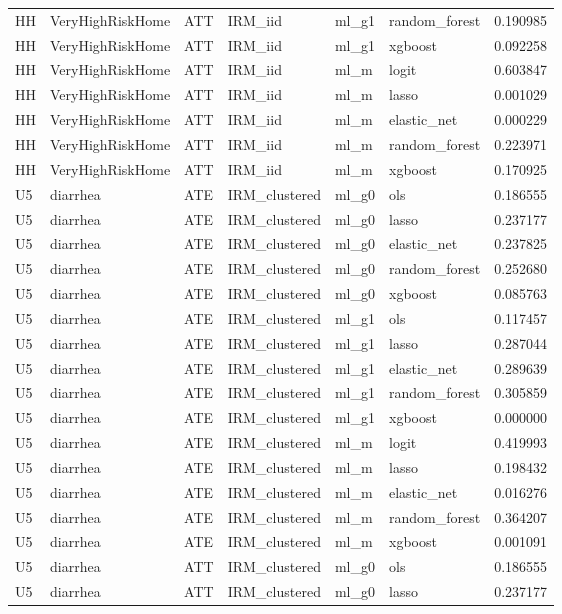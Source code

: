 \begin{longtable}{llllllr}
HH & VeryHighRiskHome & ATT & IRM\_iid & ml\_g1 & random\_forest & 0.190985 \\
HH & VeryHighRiskHome & ATT & IRM\_iid & ml\_g1 & xgboost & 0.092258 \\
HH & VeryHighRiskHome & ATT & IRM\_iid & ml\_m & logit & 0.603847 \\
HH & VeryHighRiskHome & ATT & IRM\_iid & ml\_m & lasso & 0.001029 \\
HH & VeryHighRiskHome & ATT & IRM\_iid & ml\_m & elastic\_net & 0.000229 \\
HH & VeryHighRiskHome & ATT & IRM\_iid & ml\_m & random\_forest & 0.223971 \\
HH & VeryHighRiskHome & ATT & IRM\_iid & ml\_m & xgboost & 0.170925 \\
U5 & diarrhea & ATE & IRM\_clustered & ml\_g0 & ols & 0.186555 \\
U5 & diarrhea & ATE & IRM\_clustered & ml\_g0 & lasso & 0.237177 \\
U5 & diarrhea & ATE & IRM\_clustered & ml\_g0 & elastic\_net & 0.237825 \\
U5 & diarrhea & ATE & IRM\_clustered & ml\_g0 & random\_forest & 0.252680 \\
U5 & diarrhea & ATE & IRM\_clustered & ml\_g0 & xgboost & 0.085763 \\
U5 & diarrhea & ATE & IRM\_clustered & ml\_g1 & ols & 0.117457 \\
U5 & diarrhea & ATE & IRM\_clustered & ml\_g1 & lasso & 0.287044 \\
U5 & diarrhea & ATE & IRM\_clustered & ml\_g1 & elastic\_net & 0.289639 \\
U5 & diarrhea & ATE & IRM\_clustered & ml\_g1 & random\_forest & 0.305859 \\
U5 & diarrhea & ATE & IRM\_clustered & ml\_g1 & xgboost & 0.000000 \\
U5 & diarrhea & ATE & IRM\_clustered & ml\_m & logit & 0.419993 \\
U5 & diarrhea & ATE & IRM\_clustered & ml\_m & lasso & 0.198432 \\
U5 & diarrhea & ATE & IRM\_clustered & ml\_m & elastic\_net & 0.016276 \\
U5 & diarrhea & ATE & IRM\_clustered & ml\_m & random\_forest & 0.364207 \\
U5 & diarrhea & ATE & IRM\_clustered & ml\_m & xgboost & 0.001091 \\
U5 & diarrhea & ATT & IRM\_clustered & ml\_g0 & ols & 0.186555 \\
U5 & diarrhea & ATT & IRM\_clustered & ml\_g0 & lasso & 0.237177 \\

\end{longtable}
